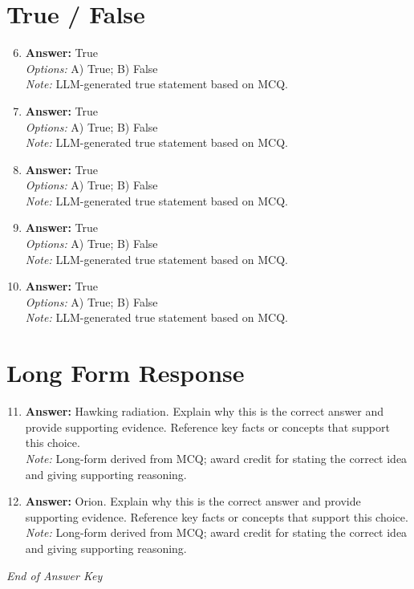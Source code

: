 \documentclass[12pt]{article}
\begin{document}
\section*{True / False}
\begin{enumerate}[label=\arabic*.]
\setcounter{enumi}{5}
\item \textbf{Answer:} True
\\ \textit{Options:} A) True; B) False
\\ \textit{Note:} LLM-generated true statement based on MCQ.
\item \textbf{Answer:} True
\\ \textit{Options:} A) True; B) False
\\ \textit{Note:} LLM-generated true statement based on MCQ.
\item \textbf{Answer:} True
\\ \textit{Options:} A) True; B) False
\\ \textit{Note:} LLM-generated true statement based on MCQ.
\item \textbf{Answer:} True
\\ \textit{Options:} A) True; B) False
\\ \textit{Note:} LLM-generated true statement based on MCQ.
\item \textbf{Answer:} True
\\ \textit{Options:} A) True; B) False
\\ \textit{Note:} LLM-generated true statement based on MCQ.
\end{enumerate}

\section*{Long Form Response}
\begin{enumerate}[label=\arabic*.]
\setcounter{enumi}{10}
\item \textbf{Answer:} Hawking radiation. Explain why this is the correct answer and provide supporting evidence. Reference key facts or concepts that support this choice.
\\ \textit{Note:} Long-form derived from MCQ; award credit for stating the correct idea and giving supporting reasoning.
\item \textbf{Answer:} Orion. Explain why this is the correct answer and provide supporting evidence. Reference key facts or concepts that support this choice.
\\ \textit{Note:} Long-form derived from MCQ; award credit for stating the correct idea and giving supporting reasoning.
\end{enumerate}

\vfill
\noindent\textit{End of Answer Key}
\end{document}
